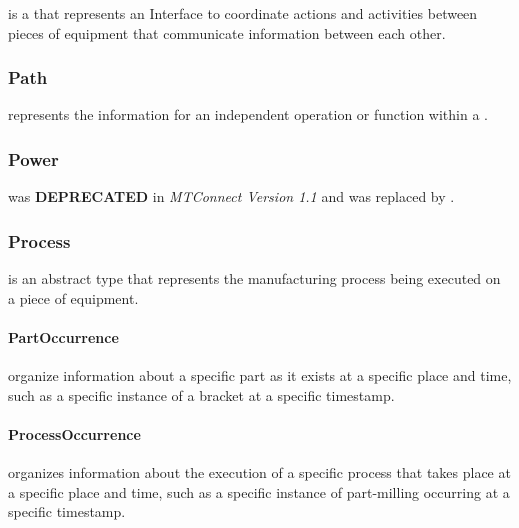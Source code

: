  is a  that represents an \gls{Interface} to coordinate actions and activities between pieces of equipment that communicate information between each other.



\subsubsection{Path}
\label{sec:Path}



 represents the information for an independent operation or function within a .



\subsubsection{Power}
\label{sec:Power}



 was \textbf{DEPRECATED} in \textit{MTConnect Version 1.1} and was replaced by .



\subsubsection{Process}
\label{sec:Process}



 is an abstract  type that represents the manufacturing process being executed on a piece of equipment.




\paragraph{PartOccurrence}\mbox{}
\label{sec:PartOccurrence}


 \gls{organize} information about a specific part as it exists at a specific place and time, such as a specific instance of a bracket at a specific timestamp.



\paragraph{ProcessOccurrence}\mbox{}
\label{sec:ProcessOccurrence}


 \glspl{organize} information about the execution of a specific process that takes place at a specific place and time, such as a specific instance of part-milling occurring at a specific timestamp.




